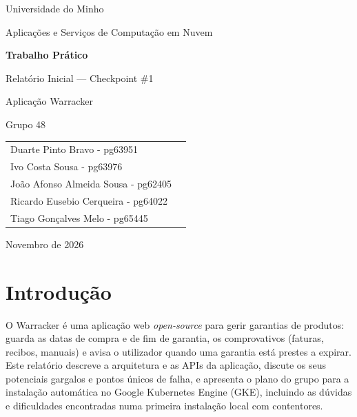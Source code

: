 \documentclass[11pt,a4paper]{article}
\newcommand{\grupo}{Grupo 48}
\begin{document}
\sloppy

\begin{titlepage}
  \centering
  \vspace*{2cm}
  {\Large Universidade do Minho\par}
  {\large Aplicações e Serviços de Computação em Nuvem\par}
  \vspace{3cm}
  {\Huge\bfseries Trabalho Prático\par}
  \vspace{0.5cm}
  {\LARGE Relatório Inicial --- Checkpoint \#1\par}
  \vspace{0.5cm}
  {\large Aplicação Warracker\par}
  \vfill
  {\Large \grupo\par}
  \vspace{0.8cm}
  \begin{tabular}{ll}
    Duarte Pinto Bravo - pg63951 \\
    Ivo Costa Sousa - pg63976 \\
    João Afonso Almeida Sousa - pg62405 \\
    Ricardo Eusebio Cerqueira - pg64022 \\
    Tiago Gonçalves Melo - pg65445 \\
  \end{tabular}
  \vspace{2cm}

  {\large Novembro de 2026\par}
\end{titlepage}

\tableofcontents
\newpage
\setcounter{page}{1}

\section{Introdução}
O Warracker é uma aplicação web \emph{open-source} para gerir garantias de produtos: guarda as datas de
compra e de fim de garantia, os comprovativos (faturas, recibos, manuais) e avisa o utilizador quando uma
garantia está prestes a expirar. Este relatório descreve a arquitetura e as APIs da aplicação, discute os
seus potenciais gargalos e pontos únicos de falha, e apresenta o plano do grupo para a instalação
automática no Google Kubernetes Engine (GKE), incluindo as dúvidas e dificuldades encontradas numa
primeira instalação local com contentores.
\end{document}

